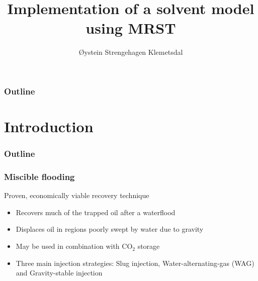 \documentclass[screen, aspectratio=43]{beamer}
\title[Short title]{Implementation of a solvent model using MRST}
\author[Ø.S. Klemetsdal]{Øystein Strengehagen Klemetsdal}
\institute[NTNU]{Department of Mathematical sciences, NTNU}
\date{} %
\begin{document}
\ntnutitlepage

\begin{frame}
  \frametitle{Outline}
  \tableofcontents
\end{frame}

\section{Introduction}

\begin{frame}
  \frametitle{Outline}
  \tableofcontents[currentsection]
\end{frame}


\begin{frame}
  \frametitle{Miscible flooding}
  Proven, economically viable recovery technique \cite{petroWiki2017Misc}
  \begin{itemize}
  \item Recovers much of the trapped oil after a waterflood
  \item Displaces oil in regions poorly swept by water due to gravity
  \item May be used in combination with CO$_2$ storage \cite{}
  \item Three main injection strategies: Slug injection, Water-alternating-gas (WAG) and
    Gravity-stable injection
  \end{itemize}
  \begin{figure}[h]
    \centering
    \hspace{1em}
  \end{figure}
\end{frame}
\end{document}
